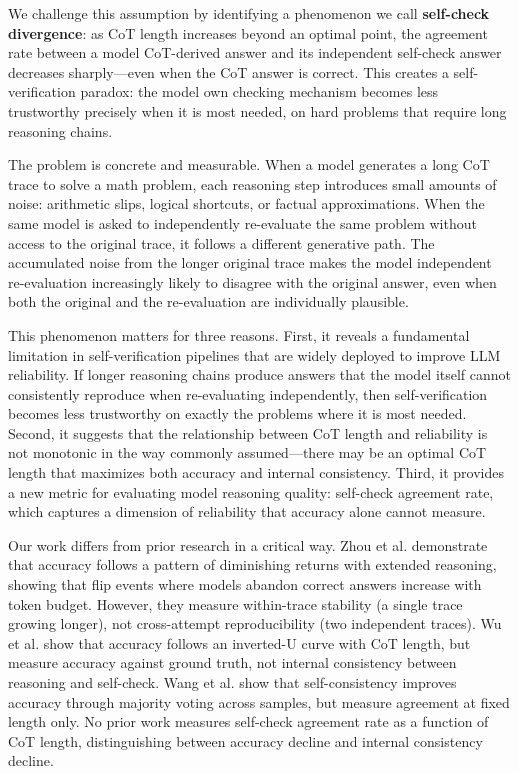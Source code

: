 \documentclass[11pt,letterpaper]{article}
\begin{document}
We challenge this assumption by identifying a phenomenon we call \textbf{self-check divergence}: as CoT length increases beyond an optimal point, the agreement rate between a model CoT-derived answer and its independent self-check answer decreases sharply---even when the CoT answer is correct. This creates a self-verification paradox: the model own checking mechanism becomes less trustworthy precisely when it is most needed, on hard problems that require long reasoning chains.

The problem is concrete and measurable. When a model generates a long CoT trace to solve a math problem, each reasoning step introduces small amounts of noise: arithmetic slips, logical shortcuts, or factual approximations. When the same model is asked to independently re-evaluate the same problem without access to the original trace, it follows a different generative path. The accumulated noise from the longer original trace makes the model independent re-evaluation increasingly likely to disagree with the original answer, even when both the original and the re-evaluation are individually plausible.

This phenomenon matters for three reasons. First, it reveals a fundamental limitation in self-verification pipelines that are widely deployed to improve LLM reliability. If longer reasoning chains produce answers that the model itself cannot consistently reproduce when re-evaluating independently, then self-verification becomes less trustworthy on exactly the problems where it is most needed. Second, it suggests that the relationship between CoT length and reliability is not monotonic in the way commonly assumed---there may be an optimal CoT length that maximizes both accuracy and internal consistency. Third, it provides a new metric for evaluating model reasoning quality: self-check agreement rate, which captures a dimension of reliability that accuracy alone cannot measure.

Our work differs from prior research in a critical way. Zhou et al. \citep{Zhou2026} demonstrate that accuracy follows a pattern of diminishing returns with extended reasoning, showing that flip events where models abandon correct answers increase with token budget. However, they measure within-trace stability (a single trace growing longer), not cross-attempt reproducibility (two independent traces). Wu et al. \citep{Wu2025} show that accuracy follows an inverted-U curve with CoT length, but measure accuracy against ground truth, not internal consistency between reasoning and self-check. Wang et al. \citep{Wang2022} show that self-consistency improves accuracy through majority voting across samples, but measure agreement at fixed length only. No prior work measures self-check agreement rate as a function of CoT length, distinguishing between accuracy decline and internal consistency decline.
\end{document}
